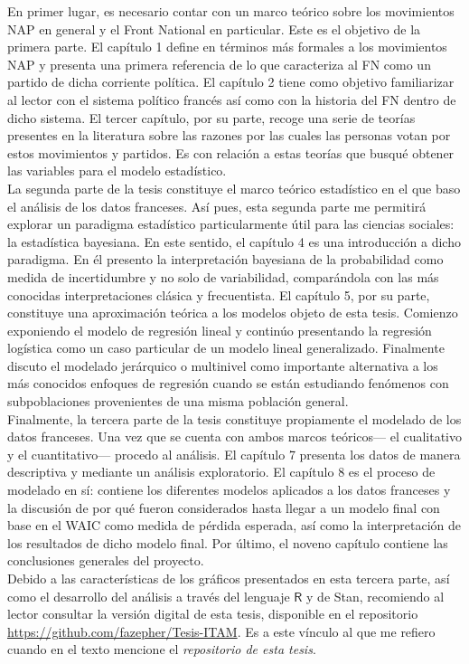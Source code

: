 En primer lugar, es necesario contar con un marco teórico sobre los movimientos NAP en general y el Front National en particular. Este es el objetivo de la primera parte. El capítulo 1 define en términos más formales a los movimientos NAP y presenta una primera referencia de lo que caracteriza al FN como un partido de dicha corriente política. El capítulo 2 tiene como objetivo familiarizar al lector con el sistema político francés así como con la historia del FN dentro de dicho sistema. El tercer capítulo, por su parte, recoge una serie de teorías presentes en la literatura sobre las razones por las cuales las personas votan por estos movimientos y partidos. Es con relación a estas teorías que busqué obtener las variables para el modelo estadístico.\\

La segunda parte de la tesis constituye el marco teórico estadístico en el que baso el análisis de los datos franceses. Así pues, esta segunda parte me permitirá explorar un paradigma estadístico particularmente útil para las ciencias sociales: la estadística bayesiana. En este sentido, el capítulo 4 es una introducción a dicho paradigma. En él presento la interpretación bayesiana de la probabilidad como medida de incertidumbre y no solo de variabilidad, comparándola con las más conocidas interpretaciones clásica y frecuentista. El capítulo 5, por su parte, constituye una aproximación teórica a los modelos objeto de esta tesis. Comienzo exponiendo el modelo de regresión lineal y continúo presentando la regresión logística como un caso particular de un modelo lineal generalizado. Finalmente discuto el modelado jerárquico o multinivel como importante alternativa a los más conocidos enfoques de regresión cuando se están estudiando fenómenos con subpoblaciones provenientes de una misma población general.\\

Finalmente, la tercera parte de la tesis constituye propiamente el modelado de los datos franceses. Una vez que se cuenta con ambos marcos teóricos--- el cualitativo y el cuantitativo--- procedo al análisis. El capítulo 7 presenta los datos de manera descriptiva y mediante un análisis exploratorio. El capítulo 8 es el proceso de modelado en sí: contiene los diferentes modelos aplicados a los datos franceses y la discusión de por qué fueron considerados hasta llegar a un modelo final con base en el WAIC como medida de pérdida esperada, así como la interpretación de los resultados de dicho modelo final. Por último, el noveno capítulo contiene las conclusiones generales del proyecto.\\ 

Debido a las características de los gráficos presentados en esta tercera parte, así como el desarrollo del análisis a través del lenguaje $\mathsf{R}$ y de Stan, recomiendo al lector consultar la versión digital de esta tesis, disponible en el repositorio \url{https://github.com/fazepher/Tesis-ITAM}. Es a este vínculo al que me refiero cuando en el texto mencione el \textit{repositorio de esta tesis}.
